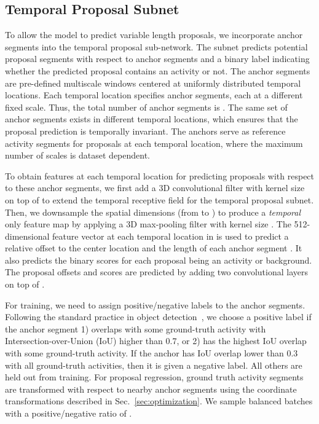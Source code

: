 \documentclass[10pt,twocolumn,letterpaper]{article}
\begin{document}
\subsection{Temporal Proposal Subnet}
\label{sec:proposal}
To allow the model to predict variable length proposals, we incorporate anchor segments into the temporal proposal sub-network.
The subnet predicts potential proposal segments with respect to anchor segments and a binary label indicating whether the predicted proposal contains an activity or not.
The anchor segments are pre-defined multiscale windows centered at  uniformly distributed temporal locations.
Each temporal location specifies  anchor segments, each at a different fixed scale.
Thus, the total number of anchor segments is .
The same set of  anchor segments exists in different temporal locations, which ensures that the proposal prediction is temporally invariant.
The anchors serve as reference activity segments for proposals at each temporal location, where the maximum number of scales  is dataset dependent.

To obtain features at each temporal location for predicting proposals with respect to these anchor segments, we first add a 3D convolutional filter with kernel size  on top of  to extend the temporal receptive field for the temporal proposal subnet.
Then, we downsample the spatial dimensions (from  to ) to produce a \textit{temporal} only feature map  by applying a 3D max-pooling filter with kernel size .
The 512-dimensional feature vector at each temporal location in  is used to predict a relative offset  to the center location and the length of each anchor segment .
It also predicts the binary scores for each proposal being an activity or background.
The proposal offsets and scores are predicted by adding two  convolutional layers on top of .

 For training, we need to assign positive/negative labels to the anchor segments.
Following the standard practice in object detection~\cite{ren2015faster}, we choose a positive label if the anchor segment 1) overlaps with some ground-truth activity with Intersection-over-Union (IoU) higher than 0.7, or 2) has the highest IoU overlap with some ground-truth activity.
If the anchor has IoU overlap lower than 0.3 with all ground-truth activities, then it is given a negative label. All others are held out from training.
For proposal regression, ground truth activity segments are transformed with respect to nearby anchor segments using the coordinate transformations described in Sec.~\ref{sec:optimization}.
We sample balanced batches with a positive/negative ratio of .
\end{document}

